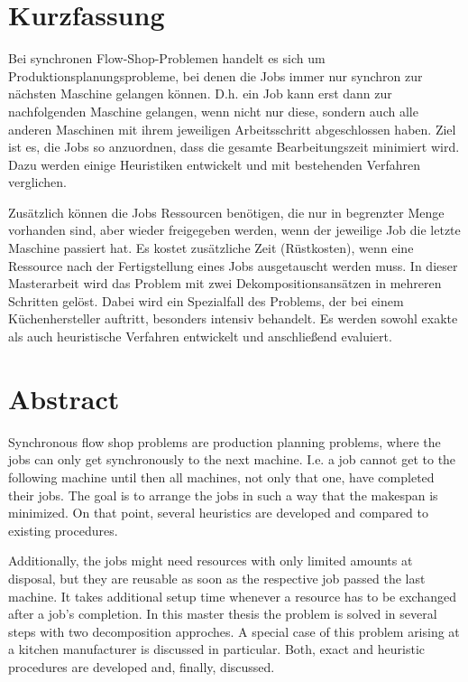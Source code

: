 \documentclass{scrreprt}
\begin{document}
\chapter*{Kurzfassung}
Bei synchronen Flow-Shop-Problemen handelt es sich um Produktions\-planungs\-probleme, 
bei denen die Jobs immer nur synchron zur nächsten Maschine gelangen können.
D.h. ein Job kann erst dann zur nachfolgenden Maschine gelangen, wenn nicht nur diese, 
sondern auch alle anderen Maschinen mit ihrem jeweiligen Arbeitsschritt abgeschlossen haben.
Ziel ist es, die Jobs so anzuordnen, dass die gesamte Bearbeitungszeit minimiert wird.
Dazu werden einige Heuristiken entwickelt und mit bestehenden Verfahren verglichen.

Zusätzlich können die Jobs Ressourcen benötigen, die nur in begrenzter Menge vorhanden sind, aber wieder freigegeben werden, 
wenn der jeweilige Job die letzte Maschine passiert hat. 
Es kostet zusätzliche Zeit (Rüstkosten), wenn eine Ressource nach der Fertigstellung eines Jobs ausgetauscht werden muss.
In dieser Masterarbeit wird das Problem mit zwei Dekompositionsansätzen in mehreren Schritten gelöst. 
Dabei wird ein Spezialfall des Problems, der bei einem Küchenhersteller auftritt, besonders intensiv behandelt. 
Es werden sowohl exakte als auch heuristische Verfahren entwickelt und anschließend evaluiert.

\chapter*{Abstract}
Synchronous flow shop problems are production planning problems,
where the jobs can only get synchronously to the next machine.
I.e. a job cannot get to the following machine until then all machines, not only that one,
have completed their jobs.
The goal is to arrange the jobs in such a way that the makespan is minimized.
On that point, several heuristics are developed and compared to existing procedures.

Additionally, the jobs might need resources with only limited amounts at disposal, but they are reusable 
as soon as the respective job passed the last machine.
It takes additional setup time whenever a resource has to be exchanged after a job's completion.
In this master thesis the problem is solved in several steps with two decomposition approches.
A special case of this problem arising at a kitchen manufacturer is discussed in particular.
Both, exact and heuristic procedures are developed and, finally, discussed.


\tableofcontents
\end{document}
